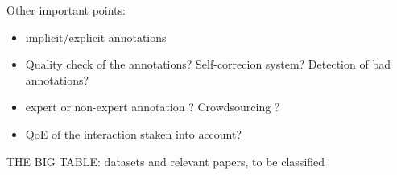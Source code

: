 Other important points:

\begin{itemize}
	\item implicit/explicit annotations
	\item Quality check of the annotations? Self-correcion system? Detection of bad annotations?
	\item expert or non-expert annotation ? Crowdsourcing ?
	\item QoE of the interaction staken into account?
\end{itemize}

THE BIG TABLE: datasets and relevant papers, to be classified


